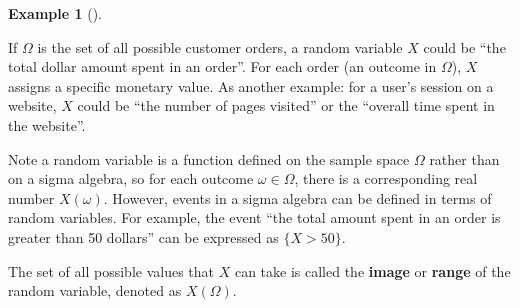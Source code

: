 \documentclass[
  letterpaper,
  DIV=11,
  numbers=noendperiod]{scrreport}
\theoremstyle{definition}
\newtheorem{example}{Example}[chapter]
\theoremstyle{plain}
\theoremstyle{plain}
\theoremstyle{definition}
\theoremstyle{remark}
\begin{document}
\begin{tcolorbox}[enhanced jigsaw, opacitybacktitle=0.6, bottomtitle=1mm, opacityback=0, toprule=.15mm, colbacktitle=quarto-callout-note-color!10!white, colback=white, left=2mm, title={Random variable examples}, breakable, rightrule=.15mm, leftrule=.75mm, titlerule=0mm, colframe=quarto-callout-note-color-frame, arc=.35mm, coltitle=black, toptitle=1mm, bottomrule=.15mm]

\begin{example}[]\protect\hypertarget{exm-random-variable}{}\label{exm-random-variable}

If \(\Omega\) is the set of all possible customer orders, a random
variable \(X\) could be ``the total dollar amount spent in an order''.
For each order (an outcome in \(\Omega\)), \(X\) assigns a specific
monetary value. As another example: for a user's session on a website,
\(X\) could be ``the number of pages visited'' or the ``overall time
spent in the website''.

\end{example}

\end{tcolorbox}

Note a random variable is a function defined on the sample space
\(\Omega\) rather than on a sigma algebra, so for each outcome
\(\omega \in \Omega\), there is a corresponding real number
\(X(\omega)\). However, events in a sigma algebra can be defined in
terms of random variables. For example, the event ``the total amount
spent in an order is greater than 50 dollars'' can be expressed as
\(\{X > 50\}\).

The set of all possible values that \(X\) can take is called the
\textbf{image} or \textbf{range} of the random variable, denoted as
\(X(\Omega)\).
\end{document}
